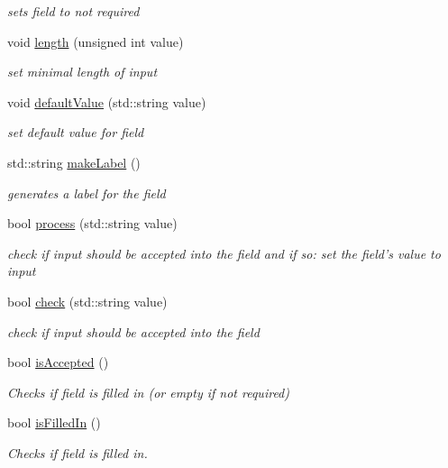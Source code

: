 \begin{DoxyCompactItemize}
\begin{DoxyCompactList}\small\item\em sets field to not required \end{DoxyCompactList}\item 
void \hyperlink{classFA_1_1Field_a00c0f9f593c80e171f8b5d18cfd4e224}{length} (unsigned int value)
\begin{DoxyCompactList}\small\item\em set minimal length of input \end{DoxyCompactList}\item 
void \hyperlink{classFA_1_1Field_a4cdb41d73148c0083c2dfe8994c0d810}{default\-Value} (std\-::string value)
\begin{DoxyCompactList}\small\item\em set default value for field \end{DoxyCompactList}\item 
std\-::string \hyperlink{classFA_1_1Field_a09bed0fa968eb80a8282527b22398c50}{make\-Label} ()
\begin{DoxyCompactList}\small\item\em generates a label for the field \end{DoxyCompactList}\item 
bool \hyperlink{classFA_1_1Field_ae14533f11add52c7e1d846676ca54805}{process} (std\-::string value)
\begin{DoxyCompactList}\small\item\em check if input should be accepted into the field and if so\-: set the field's value to input \end{DoxyCompactList}\item 
bool \hyperlink{classFA_1_1Field_a986ffd34fb6d553cbe829d686687c975}{check} (std\-::string value)
\begin{DoxyCompactList}\small\item\em check if input should be accepted into the field \end{DoxyCompactList}\item 
bool \hyperlink{classFA_1_1Field_a01be4e9f90b9c2f4f67b619570e8583d}{is\-Accepted} ()
\begin{DoxyCompactList}\small\item\em Checks if field is filled in (or empty if not required) \end{DoxyCompactList}\item 
bool \hyperlink{classFA_1_1Field_a678ddbfa901a9d5f88cc43eccd82ff91}{is\-Filled\-In} ()
\begin{DoxyCompactList}\small\item\em Checks if field is filled in. \end{DoxyCompactList}\item 

\end{DoxyCompactItemize}
